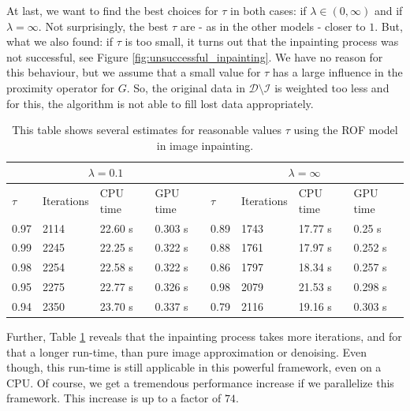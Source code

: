 \documentclass[abstracton]{scrreprt}
\begin{document}
        At last, we want to find the best choices for $\tau$ in both cases: if $\lambda \in (0, \infty)$ and if $\lambda = \infty$. Not surprisingly, the best $\tau$ are - as in the other models - closer to $1$. But, what we also found: if $\tau$ is too small, it turns out that the inpainting process was not successful, see Figure \ref{fig:unsuccessful_inpainting}. We have no reason for this behaviour, but we assume that a small value for $\tau$ has a large influence in the proximity operator for $G$. So, the original data in $\mathcal{D} \setminus \mathcal{I}$ is weighted too less and for this, the algorithm is not able to fill lost data appropriately.
            \begin{table}[!ht]
                \parbox{.9\linewidth}{
                \centering
                    \begin{tabular}{| l | l | l | l | l | l | l | l |}
                        \hline
                        \multicolumn{4}{|c|}{$\lambda = 0.1$} & \multicolumn{4}{|c|}{$\lambda = \infty$} \\ \hline\hline
                        $\tau$ & Iterations & CPU time & GPU time & $\tau$ & Iterations & CPU time & GPU time \\ \hline
                        0.97 & 2114 & 22.60 s & 0.303 s & 0.89 & 1743 & 17.77 s & 0.25 s \\ \hline
                        0.99 & 2245 & 22.25 s & 0.322 s & 0.88 & 1761 & 17.97 s & 0.252 s \\ \hline
                        0.98 & 2254 & 22.58 s & 0.322 s & 0.86 & 1797 & 18.34 s & 0.257 s \\ \hline
                        0.95 & 2275 & 22.77 s & 0.326 s & 0.98 & 2079 & 21.53 s & 0.298 s \\ \hline
                        0.94 & 2350 & 23.70 s & 0.337 s & 0.79 & 2116 & 19.16 s & 0.303 s \\ \hline
                    \end{tabular}
                }
                \caption[Best estimate of $\tau$ for image inpainting.]{This table shows several estimates for reasonable values $\tau$ using the ROF model in image inpainting.}
                \label{tab:best_tau_inpaint}
            \end{table}
        Further, Table \ref{tab:best_tau_inpaint} reveals that the inpainting process takes more iterations, and for that a longer run-time, than pure image approximation or denoising. Even though, this run-time is still applicable in this powerful framework, even on a CPU. Of course, we get a tremendous performance increase if we parallelize this framework. This increase is up to a factor of $74$.
\end{document}
